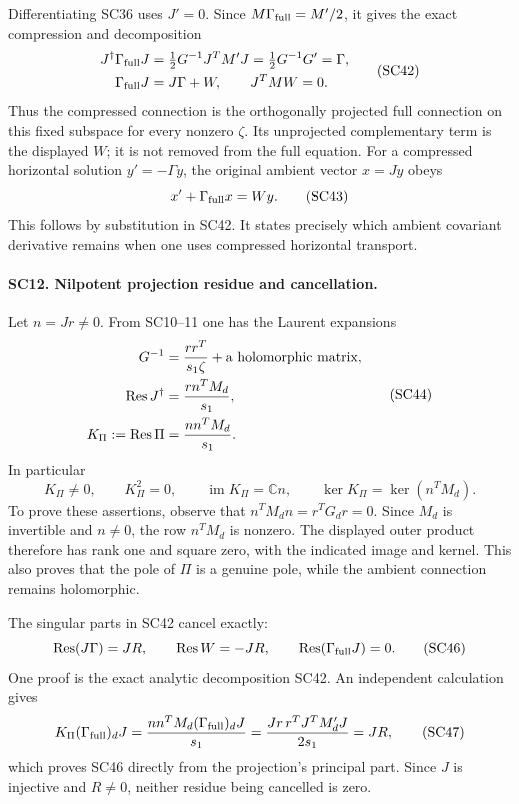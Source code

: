 Differentiating SC36 uses \(J'=0\). Since
\(M\Gamma_{\rm full}=M'/2\), it gives the exact
compression and decomposition
\[
 \begin{split}
 J^\dagger\Gamma_{\rm full}J
   &=\tfrac12G^{-1}J^TM'J=\tfrac12G^{-1}G'=\Gamma,\\
 \Gamma_{\rm full}J&=J\Gamma+W,\qquad
 J^TMW=0 .
 \end{split}\tag{SC42}
\]
Thus the compressed connection is the orthogonally projected
full connection on this fixed subspace for every nonzero
\(\zeta\). Its unprojected complementary term is the displayed
\(W\); it is not removed from the full equation. For a
compressed horizontal solution \(y'=-\Gamma y\), the
original ambient vector \(x=Jy\) obeys
\[
 x'+\Gamma_{\rm full}x=W y.
 \tag{SC43}
\]
This follows by substitution in SC42. It states precisely
which ambient covariant derivative remains when one uses
compressed horizontal transport.

\paragraph{SC12. Nilpotent projection residue and cancellation.}
Let \(n=Jr\ne0\). From SC10--11 one has the Laurent expansions
\[
 \begin{split}
 G^{-1}&=\frac{rr^T}{s_1\zeta}+\hbox{a holomorphic matrix},\\
 \operatorname{Res}J^\dagger&=\frac{r n^TM_d}{s_1},\\
 K_\Pi:=\operatorname{Res}\Pi&=\frac{n n^TM_d}{s_1}.
 \end{split}\tag{SC44}
\]
In particular
\[
 K_\Pi\ne0,\qquad K_\Pi^2=0,\qquad
 \operatorname{im}K_\Pi=\mathbb Cn,\qquad
 \ker K_\Pi=\ker(n^TM_d).
 \tag{SC45}
\]
To prove these assertions, observe that
\(n^TM_dn=r^TG_dr=0\). Since \(M_d\) is invertible and
\(n\ne0\), the row \(n^TM_d\) is nonzero. The displayed
outer product therefore has rank one and square zero,
with the indicated image and kernel. This also proves that
the pole of \(\Pi\) is a genuine pole, while the ambient
connection remains holomorphic.

The singular parts in SC42 cancel exactly:
\[
 \operatorname{Res}(J\Gamma)=JR,\qquad
 \operatorname{Res}W=-JR,\qquad
 \operatorname{Res}(\Gamma_{\rm full}J)=0 .
 \tag{SC46}
\]
One proof is the exact analytic decomposition SC42.
An independent calculation gives
\[
 K_\Pi(\Gamma_{\rm full})_dJ
  =\frac{n n^TM_d(\Gamma_{\rm full})_dJ}{s_1}
  =\frac{Jr\,r^TJ^TM'_dJ}{2s_1}
  =JR ,
 \tag{SC47}
\]
which proves SC46 directly from the projection's principal
part. Since \(J\) is injective and \(R\ne0\), neither residue
being cancelled is zero.

